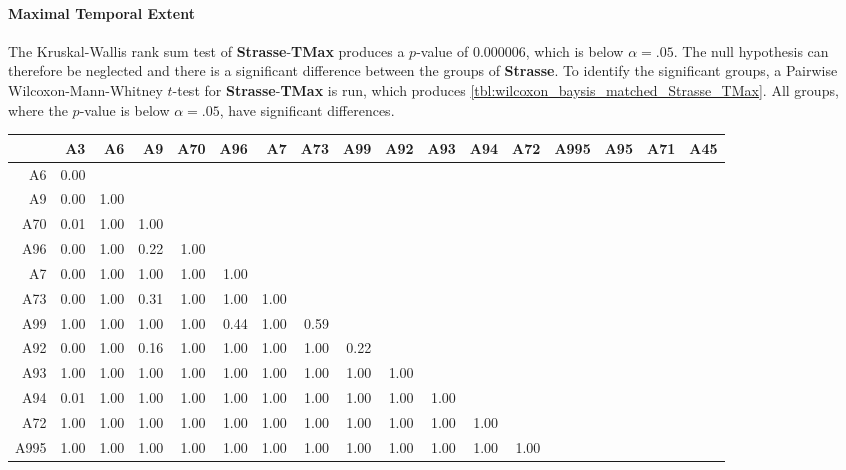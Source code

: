 \paragraph{Maximal Temporal Extent}
The Kruskal-Wallis rank sum test of \textbf{Strasse}-\textbf{TMax} produces a $p$-value of 0.000006, which is below $\alpha=.05$. The null hypothesis can therefore be neglected and there is a significant difference between the groups of \textbf{Strasse}. To identify the significant groups, a Pairwise Wilcoxon-Mann-Whitney $t$-test for \textbf{Strasse}-\textbf{TMax} is run, which produces \autoref{tbl:wilcoxon_baysis_matched_Strasse_TMax}. All groups, where the $p$-value is below $\alpha=.05$, have significant differences. 
\begin{table}[ht]
	\tiny
	\setlength{\tabcolsep}{4pt}
	\centering
	\begin{tabular}{rrrrrrrrrrrrrrrrr}
		\toprule
				& A3 & A6 & A9 & A70 & A96 & A7 & A73 & A99 & A92 & A93 & A94 & A72 & A995 & A95 & A71 & A45 \\ 
		\midrule
		A6 		& 0.00 &  &  &  &  &  &  &  &  &  &  &  &  &  &  &  \\ 
		A9 		& 0.00 & 1.00 &  &  &  &  &  &  &  &  &  &  &  &  &  &  \\ 
		A70 	& 0.01 & 1.00 & 1.00 &  &  &  &  &  &  &  &  &  &  &  &  &  \\ 
		A96 	& 0.00 & 1.00 & 0.22 & 1.00 &  &  &  &  &  &  &  &  &  &  &  &  \\ 
		A7 		& 0.00 & 1.00 & 1.00 & 1.00 & 1.00 &  &  &  &  &  &  &  &  &  &  &  \\ 
		A73 	& 0.00 & 1.00 & 0.31 & 1.00 & 1.00 & 1.00 &  &  &  &  &  &  &  &  &  &  \\ 
		A99 	& 1.00 & 1.00 & 1.00 & 1.00 & 0.44 & 1.00 & 0.59 &  &  &  &  &  &  &  &  &  \\ 
		A92 	& 0.00 & 1.00 & 0.16 & 1.00 & 1.00 & 1.00 & 1.00 & 0.22 &  &  &  &  &  &  &  &  \\ 
		A93 	& 1.00 & 1.00 & 1.00 & 1.00 & 1.00 & 1.00 & 1.00 & 1.00 & 1.00 &  &  &  &  &  &  &  \\ 
		A94 	& 0.01 & 1.00 & 1.00 & 1.00 & 1.00 & 1.00 & 1.00 & 1.00 & 1.00 & 1.00 &  &  &  &  &  &  \\ 
		A72 	& 1.00 & 1.00 & 1.00 & 1.00 & 1.00 & 1.00 & 1.00 & 1.00 & 1.00 & 1.00 & 1.00 &  &  &  &  &  \\ 
		A995 	& 1.00 & 1.00 & 1.00 & 1.00 & 1.00 & 1.00 & 1.00 & 1.00 & 1.00 & 1.00 & 1.00 & 1.00 &  &  &  &  \\ 

\end{tabular}
\end{table}
